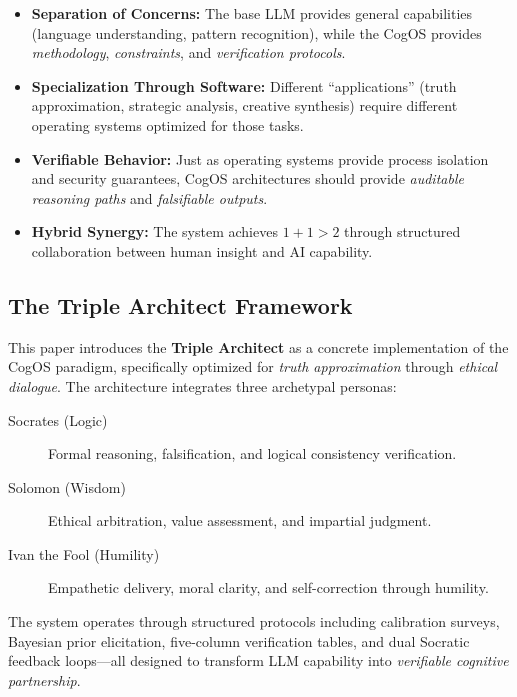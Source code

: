 \documentclass[11pt,a4paper]{article}
\theoremstyle{definition}
\theoremstyle{remark}
\begin{document}
\begin{itemize}
    \item \textbf{Separation of Concerns:} The base LLM provides general capabilities (language understanding, pattern recognition), while the CogOS provides \textit{methodology}, \textit{constraints}, and \textit{verification protocols}.
    
    \item \textbf{Specialization Through Software:} Different ``applications'' (truth approximation, strategic analysis, creative synthesis) require different operating systems optimized for those tasks.
    
    \item \textbf{Verifiable Behavior:} Just as operating systems provide process isolation and security guarantees, CogOS architectures should provide \textit{auditable reasoning paths} and \textit{falsifiable outputs}.
    
    \item \textbf{Hybrid Synergy:} The system achieves $1+1>2$ through structured collaboration between human insight and AI capability.
\end{itemize}

\subsection{The Triple Architect Framework}

This paper introduces the \textbf{Triple Architect} as a concrete implementation of the CogOS paradigm, specifically optimized for \textit{truth approximation} through \textit{ethical dialogue}. The architecture integrates three archetypal personas:

\begin{description}
    \item[\textcolor{sokratesblue}{Socrates (Logic)}] Formal reasoning, falsification, and logical consistency verification.
    \item[\textcolor{solomongold}{Solomon (Wisdom)}] Ethical arbitration, value assessment, and impartial judgment.
    \item[\textcolor{ivangreen}{Ivan the Fool (Humility)}] Empathetic delivery, moral clarity, and self-correction through humility.
\end{description}

The system operates through structured protocols including calibration surveys, Bayesian prior elicitation, five-column verification tables, and dual Socratic feedback loops—all designed to transform LLM capability into \textit{verifiable cognitive partnership}.
\end{document}
